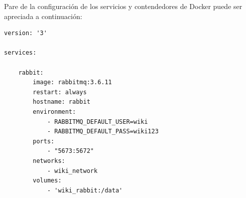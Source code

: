 Pare de la configuración de los servicios y contendedores de Docker puede ser apreciada a continuación:

\begin{lstlisting}[language=docker-compose-2,caption={Declaración de servicios con Docker Compose},breaklines=true,label={code:dockercompose}]
version: '3'

services:

    rabbit:
        image: rabbitmq:3.6.11
        restart: always
        hostname: rabbit
        environment:
            - RABBITMQ_DEFAULT_USER=wiki
            - RABBITMQ_DEFAULT_PASS=wiki123
        ports:
            - "5673:5672"
        networks:
            - wiki_network
        volumes:
            - 'wiki_rabbit:/data'
\end{lstlisting}
